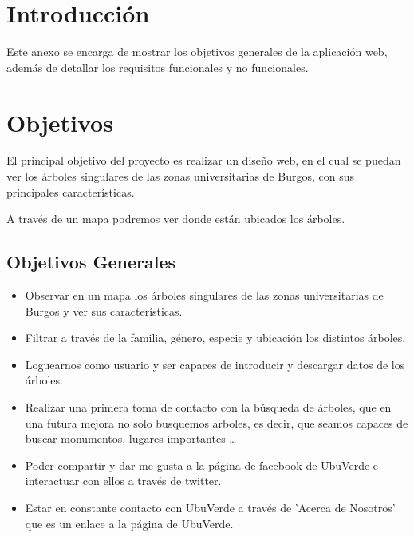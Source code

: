 
\section{Introducción}
Este anexo se encarga de mostrar los objetivos generales de la aplicación web, además de detallar los requisitos funcionales y no funcionales.

\section{Objetivos}
	El principal objetivo del proyecto es realizar un diseño web, en el cual se puedan ver los árboles singulares de las zonas universitarias de Burgos, con sus principales características.

	A través de un mapa podremos ver donde están ubicados los árboles. 
	\subsection{Objetivos Generales}
\begin{itemize}
	\item Observar en un mapa los árboles singulares de las zonas universitarias de Burgos y ver sus características.
	\item Filtrar a través de la familia, género, especie y ubicación los distintos árboles.
	\item Loguearnos como usuario y ser capaces de introducir y descargar datos de los árboles.
	\item Realizar una primera toma de contacto con la búsqueda de árboles, que en una futura mejora no solo busquemos arboles, es decir, que seamos capaces de buscar monumentos, lugares importantes \ldots
	\item Poder compartir y dar me gusta a la página de facebook de UbuVerde e interactuar con ellos a través de twitter. 
	\item Estar en constante contacto con UbuVerde a través de 'Acerca de Nosotros' que es un enlace a la página de UbuVerde.
\end{itemize}

